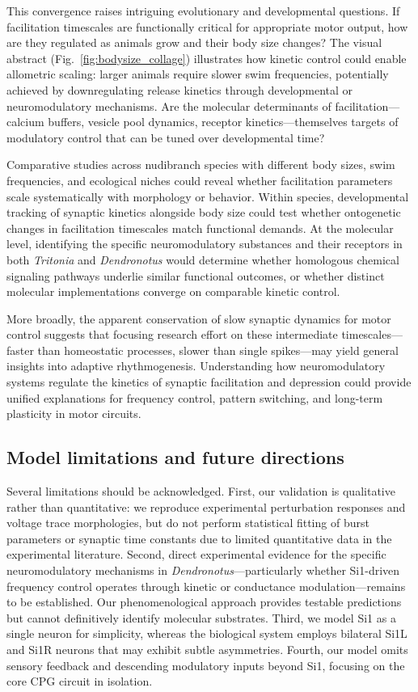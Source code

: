 \documentclass[nofootinbib,aip,amsmath,amssymb,preprint,twocolumn,floatfix,10pt]{revtex4-2}
\begin{document}
This convergence raises intriguing evolutionary and developmental questions. If facilitation timescales are functionally critical for appropriate motor output, how are they regulated as animals grow and their body size changes? The visual abstract (Fig.~\ref{fig:bodysize_collage}) illustrates how kinetic control could enable allometric scaling: larger animals require slower swim frequencies, potentially achieved by downregulating release kinetics through developmental or neuromodulatory mechanisms. Are the molecular determinants of facilitation---calcium buffers, vesicle pool dynamics, receptor kinetics---themselves targets of modulatory control that can be tuned over developmental time?

Comparative studies across nudibranch species with different body sizes, swim frequencies, and ecological niches could reveal whether facilitation parameters scale systematically with morphology or behavior. Within species, developmental tracking of synaptic kinetics alongside body size could test whether ontogenetic changes in facilitation timescales match functional demands. At the molecular level, identifying the specific neuromodulatory substances and their receptors in both \textit{Tritonia} and \textit{Dendronotus} would determine whether homologous chemical signaling pathways underlie similar functional outcomes, or whether distinct molecular implementations converge on comparable kinetic control.

More broadly, the apparent conservation of slow synaptic dynamics for motor control suggests that focusing research effort on these intermediate timescales---faster than homeostatic processes, slower than single spikes---may yield general insights into adaptive rhythmogenesis. Understanding how neuromodulatory systems regulate the kinetics of synaptic facilitation and depression could provide unified explanations for frequency control, pattern switching, and long-term plasticity in motor circuits.

\subsection{Model limitations and future directions}

Several limitations should be acknowledged. First, our validation is qualitative rather than quantitative: we reproduce experimental perturbation responses and voltage trace morphologies, but do not perform statistical fitting of burst parameters or synaptic time constants due to limited quantitative data in the experimental literature. Second, direct experimental evidence for the specific neuromodulatory mechanisms in \textit{Dendronotus}---particularly whether Si1-driven frequency control operates through kinetic or conductance modulation---remains to be established. Our phenomenological approach provides testable predictions but cannot definitively identify molecular substrates. Third, we model Si1 as a single neuron for simplicity, whereas the biological system employs bilateral Si1L and Si1R neurons that may exhibit subtle asymmetries. Fourth, our model omits sensory feedback and descending modulatory inputs beyond Si1, focusing on the core CPG circuit in isolation.
\end{document}
